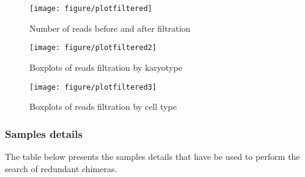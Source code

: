 \documentclass[a4paper]{article}
\begin{document}
\begin{figure}[]

\texttt{[image: figure/plotfiltered]} \caption[Number of reads before and after filtration]{Number of reads before and after filtration\label{fig:plotfiltered}}
\end{figure}




\begin{figure}[]


{\centering \texttt{[image: figure/plotfiltered2]} 

}

\caption[Boxplots of reads filtration by karyotype]{Boxplots of reads filtration by karyotype\label{fig:plotfiltered2}}
\end{figure}




\begin{figure}[]


{\centering \texttt{[image: figure/plotfiltered3]} 

}

\caption[Boxplots of reads filtration by cell type]{Boxplots of reads filtration by cell type\label{fig:plotfiltered3}}
\end{figure}







\subsubsection{Samples details}

The table below presents the samples details that have be used to perform the search of redundant chimeras.
\end{document}
